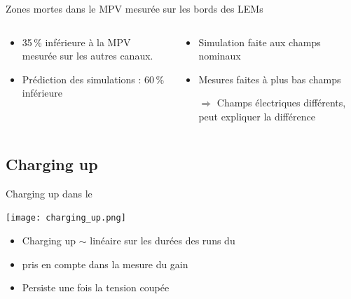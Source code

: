 \begin{frame}{Zones mortes dans le \TOO{}}{MPV mesurée sur les bords des LEMs}
\begin{scriptsize}
\begin{columns}
\begin{column}{0.5\textwidth}
                \end{column}
            \end{columns}
            \begin{columns}
                \begin{column}{0.5\textwidth}
                    \begin{itemize}
                        \item 35\,\% inférieure à la MPV mesurée sur les autres canaux.
                        \item Prédiction des simulations : 60\,\% inférieure
                    \end{itemize}
                \end{column}
                \begin{column}{0.5\textwidth}
                    \begin{itemize}
                        \item Simulation faite aux champs nominaux
                        \item Mesures faites à plus bas champs
                        \item[$\Rightarrow$] Champs électriques différents, peut expliquer la différence 
                    \end{itemize}
                \end{column}
            \end{columns}
        \end{scriptsize}
    \end{frame}

    \subsection{Charging up}
    \begin{frame}{Charging up dans le \TOO{}}
        \begin{scriptsize}
            \texttt{[image: charging\_up.png]}
            \begin{itemize}
                \item Charging up $\sim$ linéaire sur les durées des runs du \TOO{}
                \item pris en compte dans la mesure du gain
                \item Persiste une fois la tension coupée
            \end{itemize}
        \end{scriptsize}
    \end{frame}
    
